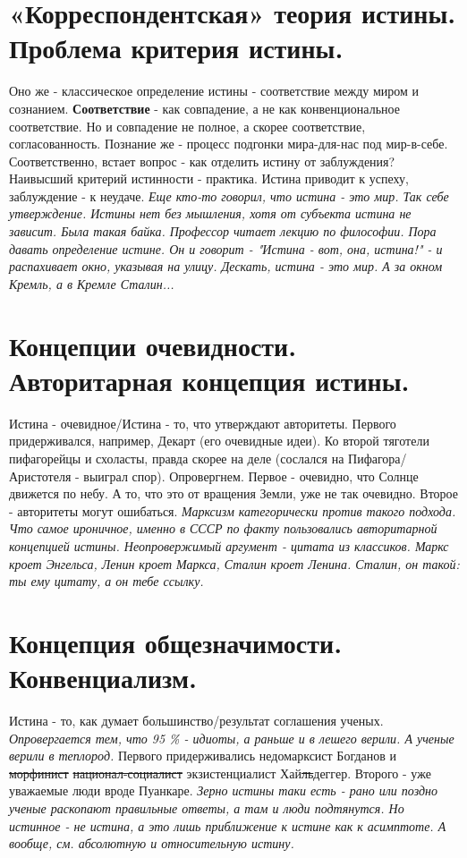 \section{ «Корреспондентская» теория истины. Проблема критерия истины.}
Оно же - классическое определение истины - соответствие между миром и сознанием. \textbf{Соответствие}  - как совпадение, а не как конвенциональное соответствие. Но и совпадение не полное, а скорее соответствие, согласованность. Познание же - процесс подгонки мира-для-нас под мир-в-себе. Соответственно, встает вопрос - как отделить истину от заблуждения? Наивысший критерий истинности - практика. Истина приводит к успеху, заблуждение - к неудаче. \textit{Еще кто-то говорил, что истина - это мир. Так себе утверждение. Истины нет без мышления, хотя от субъекта истина не зависит. Была такая байка. Профессор читает лекцию по философии. Пора давать определение истине. Он и говорит - "Истина - вот, она, истина!" - и распахивает окно, указывая на улицу. Дескать, истина - это мир. А за окном Кремль, а в Кремле Сталин...}

\section{ Концепции очевидности. Авторитарная концепция истины.}
Истина - очевидное/Истина - то, что утверждают авторитеты. Первого придерживался, например, Декарт (его очевидные идеи). Ко второй тяготели пифагорейцы и схоласты, правда скорее на деле (сослался на Пифагора/Аристотеля - выиграл спор). Опровергнем. Первое - очевидно, что Солнце движется по небу. А то, что это от вращения Земли, уже не так очевидно. Второе - авторитеты могут ошибаться. \textit{Марксизм категорически против такого подхода. Что самое ироничное, именно в СССР по факту пользовались авторитарной концепцией истины. Неопровержимый аргумент - цитата из классиков. Маркс кроет Энгельса, Ленин кроет Маркса, Сталин кроет Ленина. Сталин, он такой: ты ему цитату, а он тебе ссылку.}

\section{ Концепция общезначимости. Конвенциализм.}
Истина - то, как думает большинство/результат соглашения ученых. \textit{Опровергается тем, что 95 \% - идиоты, а раньше и в лешего верили. А ученые верили в теплород.} Первого придерживались недомарксист Богданов и \sout{морфинист} \sout{национал-социалист} экзистенциалист Хай\sout{ль}деггер. Второго - уже уважаемые люди вроде Пуанкаре. \textit{Зерно истины таки есть - рано или поздно ученые раскопают правильные ответы, а там и люди подтянутся. Но истинное - не истина, а это лишь приближение к истине как к асимптоте. А вообще, см. абсолютную и относительную истину.}

